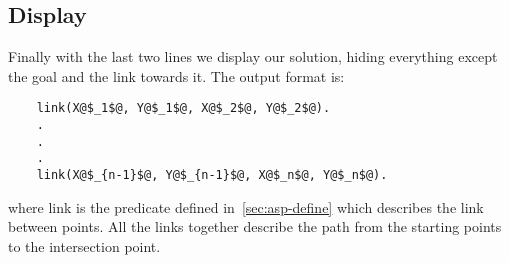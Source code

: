 \subsection{Display}

Finally with the last two lines we display our solution, hiding everything except the goal and the link towards it. The output format is:

\begin{verbatim}
    link(X@$_1$@, Y@$_1$@, X@$_2$@, Y@$_2$@).
    .
    .
    .
    link(X@$_{n-1}$@, Y@$_{n-1}$@, X@$_n$@, Y@$_n$@).
\end{verbatim}

where link is the predicate defined in~\ref{sec:asp-define} which describes the link between points. All the links together describe the path from the starting points to the intersection point.
